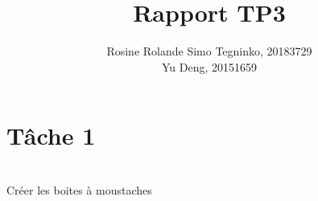 \documentclass{article}
\title{Rapport TP3}
\author{Rosine Rolande Simo Tegninko, 20183729\\
Yu Deng, 20151659}
\date{}
\begin{document}
\maketitle

\section*{Tâche 1}\\
Créer les boites à moustaches
\end{document}
